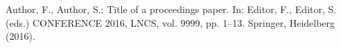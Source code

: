 \documentclass{llncs}
\begin{document}




\begin{thebibliography}{1}

Author, F., Author, S.: Title of a proceedings paper. In: Editor,
F., Editor, S. (eds.) CONFERENCE 2016, LNCS, vol. 9999, pp. 1--13.
Springer, Heidelberg (2016). 

\end{thebibliography}
\end{document}
